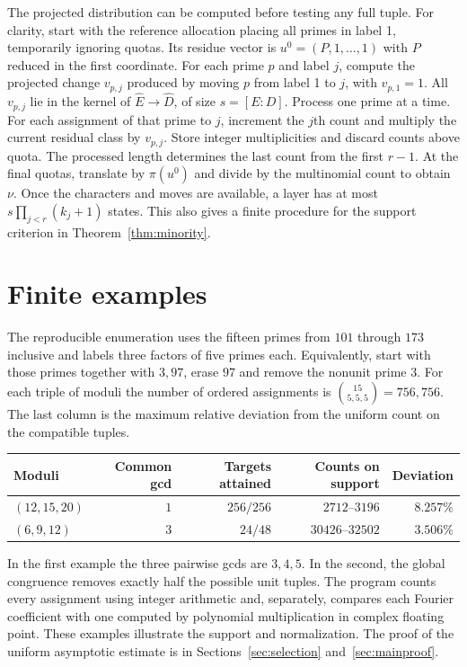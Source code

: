 \documentclass[11pt]{article}
\begin{document}
The projected distribution can be computed before testing any full tuple. For clarity, start with the reference allocation placing all primes in label 1, temporarily ignoring quotas. Its residue vector is $u^0=(P,1,\ldots,1)$ with $P$ reduced in the first coordinate. For each prime $p$ and label $j$, compute the projected change $v_{p,j}$ produced by moving $p$ from label 1 to $j$, with $v_{p,1}=1$. All $v_{p,j}$ lie in the kernel of $\widehat E\to\widehat D$, of size $s=[E:D]$. Process one prime at a time. For each assignment of that prime to $j$, increment the $j$th count and multiply the current residual class by $v_{p,j}$. Store integer multiplicities and discard counts above quota. The processed length determines the last count from the first $r-1$. At the final quotas, translate by $\pi(u^0)$ and divide by the multinomial count to obtain $\nu$. Once the characters and moves are available, a layer has at most $s\prod_{j<r}(k_j+1)$ states. This also gives a finite procedure for the support criterion in Theorem~\ref{thm:minority}.

\section{Finite examples}
The reproducible enumeration uses the fifteen primes from $101$ through $173$ inclusive and labels three factors of five primes each. Equivalently, start with those primes together with $3,97$, erase $97$ and remove the nonunit prime $3$. For each triple of moduli the number of ordered assignments is $\binom{15}{5,5,5}=756{,}756$. The last column is the maximum relative deviation from the uniform count on the compatible tuples.
\begin{center}
\begin{tabular}{@{}lrrrr@{}}\toprule
Moduli & Common gcd & Targets attained & Counts on support & Deviation\\ \midrule
$(12,15,20)$ & $1$ & $256/256$ & $2712$--$3196$ & $8.257\%$\\
$(6,9,12)$ & $3$ & $24/48$ & $30426$--$32502$ & $3.506\%$\\ \bottomrule
\end{tabular}
\end{center}
In the first example the three pairwise gcds are $3,4,5$. In the second, the global congruence removes exactly half the possible unit tuples. The program counts every assignment using integer arithmetic and, separately, compares each Fourier coefficient with one computed by polynomial multiplication in complex floating point. These examples illustrate the support and normalization. The proof of the uniform asymptotic estimate is in Sections~\ref{sec:selection} and~\ref{sec:mainproof}.
\end{document}
